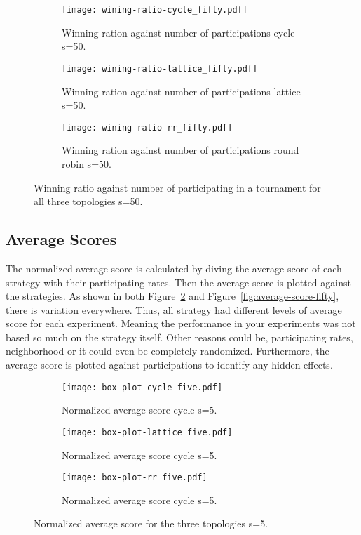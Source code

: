 \begin{figure}[H]
\centering
    \begin{subfigure}[t]{1\textwidth}
    \centering
        \texttt{[image: wining-ratio-cycle\_fifty.pdf]}
    \caption{Winning ration against number of participations cycle s=50.}
    \end{subfigure}
\hfill
    \begin{subfigure}[t]{1\textwidth}\centering
    \centering
        \texttt{[image: wining-ratio-lattice\_fifty.pdf]}
    \caption{Winning ration against number of participations lattice s=50.}
    \end{subfigure}
\hfill
    \begin{subfigure}[t]{1\textwidth}\centering
    \centering
        \texttt{[image: wining-ratio-rr\_fifty.pdf]}
    \caption{Winning ration against number of participations round robin s=50.}
    \end{subfigure}
\caption{Winning ratio against number of participating in a tournament
             for all three topologies s=50.}
\label{fig:winning-ratio-fifty}
\end{figure}

\subsection{Average Scores}

The normalized average score is calculated by diving the average score
of each strategy with their participating rates. Then the average score
is plotted against the strategies. As shown in both Figure~\ref{fig:average-score-five}
and Figure~\ref{fig:average-score-fifty},
there is variation everywhere. Thus, all strategy had different levels of
average score for each experiment. Meaning the performance in your experiments
was not based so much on the strategy itself. Other reasons could be, participating
rates, neighborhood or it could even be completely randomized. Furthermore,
the average score is plotted against participations to identify any hidden effects.

\begin{figure}[H]
\centering
    \begin{subfigure}[t]{1\textwidth}
    \centering
        \texttt{[image: box-plot-cycle\_five.pdf]}
    \caption{Normalized average score cycle s=5.}
    \end{subfigure}
\hfill
    \begin{subfigure}[t]{1\textwidth}\centering
    \centering
        \texttt{[image: box-plot-lattice\_five.pdf]}
    \caption{Normalized average score cycle s=5.}
    \end{subfigure}
\hfill
    \begin{subfigure}[t]{1\textwidth}\centering
    \centering
        \texttt{[image: box-plot-rr\_five.pdf]}
    \caption{Normalized average score cycle s=5.}
    \end{subfigure}
\caption{Normalized average score for the three topologies s=5.}
\label{fig:average-score-five}
\end{figure}

